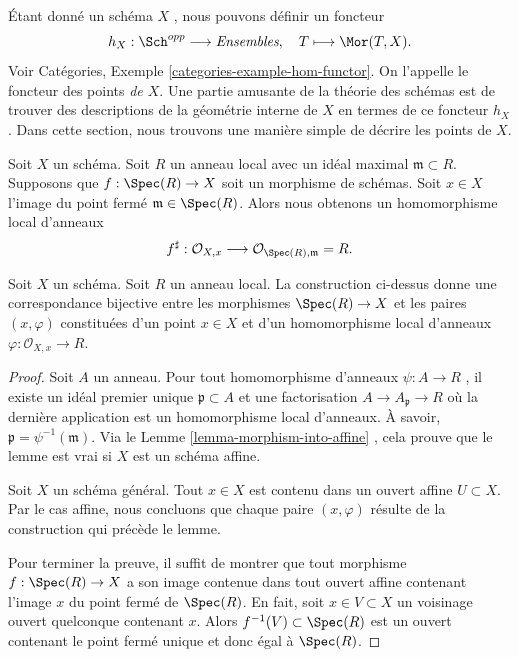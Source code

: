 \noindent
Étant donné un schéma  $X$ , nous pouvons définir un foncteur
$$
h_X : \Sch^{opp}
\longrightarrow
\textit{Ensembles}, \quad
T \longmapsto \Mor(T, X).
$$
Voir Catégories, Exemple  \ref{categories-example-hom-functor}. On l'appelle le foncteur des points
 {\it  de  $X$}. Une partie amusante de la
théorie des schémas est de trouver des descriptions de la géométrie interne de
 $X$  en termes de ce foncteur  $h_X$. Dans cette section, nous
trouvons une manière simple de décrire les points de  $X$.

\medskip\noindent
Soit  $X$  un schéma. Soit  $R$  un anneau local avec un idéal
maximal  $\mathfrak m \subset R$. Supposons que  $f : \Spec(R) \to X$  soit un morphisme de schémas.
Soit  $x \in X$  l'image du point fermé  $\mathfrak m \in \Spec(R)$. Alors nous obtenons un
homomorphisme local d'anneaux
$$
f^\sharp :
\mathcal{O}_{X, x}
\longrightarrow
\mathcal{O}_{\Spec(R), \mathfrak m} = R.
$$

\begin{lemma}
\label{lemma-morphism-from-spec-local-ring}
Soit  $X$  un schéma. Soit  $R$  un anneau local. La construction
ci-dessus donne une correspondance bijective entre les morphismes  $\Spec(R) \to X$  et
les paires  $(x, \varphi)$  constituées d'un point  $x \in X$  et d'un homomorphisme
local d'anneaux  $\varphi : \mathcal{O}_{X, x} \to R$.
\end{lemma}

\begin{proof}
Soit  $A$  un anneau. Pour tout homomorphisme d'anneaux  $\psi : A \to R$ , il
existe un idéal premier unique  $\mathfrak p \subset A$  et une factorisation  $A \to A_{\mathfrak p} \to R$  où
la dernière application est un homomorphisme local d'anneaux. À savoir,
 $\mathfrak p = \psi^{-1}(\mathfrak m)$. Via le Lemme  \ref{lemma-morphism-into-affine} , cela prouve que le lemme est vrai si
 $X$  est un schéma affine.

\medskip\noindent
Soit  $X$  un schéma général. Tout  $x \in X$  est contenu dans un ouvert
affine  $U \subset X$. Par le cas affine, nous concluons que chaque paire
 $(x, \varphi)$  résulte de la construction qui précède le lemme.

\medskip\noindent
Pour terminer la preuve, il suffit de montrer que tout morphisme  $f : \Spec(R) \to X$  a
son image contenue dans tout ouvert affine contenant l'image  $x$  du point
fermé de  $\Spec(R)$. En fait, soit  $x \in V \subset X$  un voisinage ouvert quelconque
contenant  $x$. Alors  $f^{-1}(V) \subset \Spec(R)$  est un ouvert contenant le point fermé
unique et donc égal à  $\Spec(R)$.
\end{proof}

